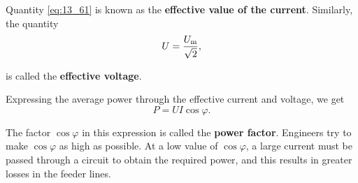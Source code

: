 \noindent
Quantity \eqref{eq:13_61} is known as the \textbf{effective value of the current}.
Similarly, the quantity
\begin{equation}\label{eq:13_62}
    U = \frac{U_{\text{m}}}{\sqrt{2}},
\end{equation}

\noindent
is called the \textbf{effective voltage}.

Expressing the average power through the effective current and voltage, we get
\begin{equation}\label{eq:13_63}
    P = U I \cos\varphi.
\end{equation}

\noindent
The factor $\cos\varphi$ in this expression is called the \textbf{power factor}.
Engineers try to make $\cos\varphi$ as high as possible.
At a low value of $\cos\varphi$, a large current must be passed through a circuit to obtain the required power, and this results in greater losses in the feeder lines.
